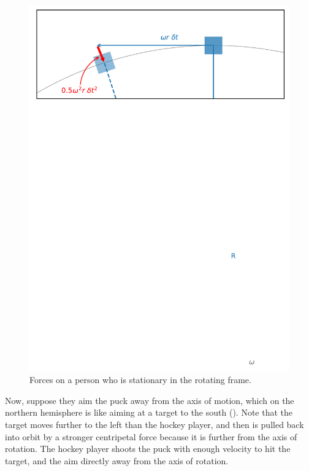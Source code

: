 \begin{figure}[hbt]
  \begin{center}
    \includegraphics{figs/Coriolis/ThrowerMotion}
    \caption{Forces on a person who is stationary in the rotating frame. }
    \label{fig:ThrowerMotion}  
  \end{center}
\end{figure}

Now, suppose they aim the puck away from the axis of motion, which on the northern hemisphere is like aiming at a target to the south ().  Note that the target moves further to the left than the hockey player, and then is pulled back into orbit by a stronger centripetal force because it is further from the axis of rotation. The hockey player shoots the puck with enough velocity to hit the target, and the aim directly away from the axis of rotation.  

